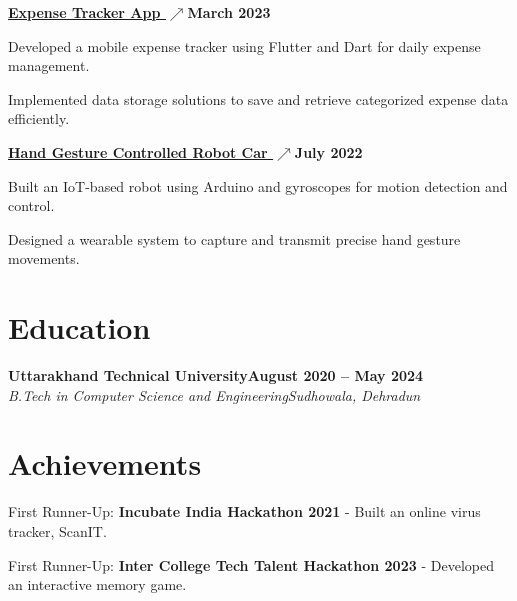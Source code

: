 \documentclass[letterpaper,10pt]{article}
\newcommand{\heading}[2]{
  \hspace{10pt}#1\hfill#2\\
}
\newcommand{\headingBf}[2]{
  \heading{\textbf{#1}}{\textbf{#2}}
}
\newcommand{\headingIt}[2]{
  \heading{\textit{#1}}{\textit{#2}}
}
\newenvironment{resume_list}{
  \vspace{-7pt}
  \begin{itemize}[itemsep=-2px, parsep=1pt, leftmargin=30pt]
}{
  \end{itemize}
}
\begin{document}
    \headingBf {\underline{\href{https://github.com/surajkr97/Expense-Tracker-App}{Expense Tracker App \(\nearrow\)}}}{March 2023}
    \begin{resume_list}
    \item Developed a mobile expense tracker using Flutter and Dart for daily expense management.
    \item Implemented data storage solutions to save and retrieve categorized expense data efficiently.
  \end{resume_list}

    \headingBf {\underline{\href{https://surajkr97.hashnode.dev/exploring-the-world-of-iot-from-robo-cars-to-robo-warrior?source=more_articles_bottom_blogs}{Hand Gesture Controlled Robot Car \(\nearrow\)}}}{July 2022}
    \begin{resume_list}
    \item Built an IoT-based robot using Arduino and gyroscopes for motion detection and control.
    \item Designed a wearable system to capture and transmit precise hand gesture movements.
  \end{resume_list}


  \section{Education}

  \headingBf{Uttarakhand Technical University}{August 2020 -- May 2024}
  \headingIt{B.Tech in Computer Science and Engineering}{Sudhowala, Dehradun}


  \section{Achievements}

  \begin{resume_list}
  \vspace{5pt}
    \item First Runner-Up: \textbf{Incubate India Hackathon 2021} - Built an online virus tracker, ScanIT.
    \item First Runner-Up: \textbf{Inter College Tech Talent Hackathon 2023} - Developed an interactive memory game.
  \end{resume_list}
\end{document}
